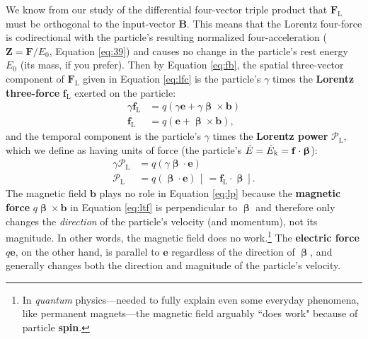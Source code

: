 \documentclass[12pt]{article}
\renewcommand{\vv}[1]{\mathbf{#1}}
\newcommand{\vvbeta}{\bm{\upbeta}}
\begin{document}
We know from our study of the differential four-vector triple product that $\vv F_{\mathrm{L}}$ must be orthogonal to the input-vector $\vv B$. This means that the Lorentz four-force is codirectional with the particle's resulting normalized four-acceleration ($\vv Z =  \vv F / E_0$, Equation \ref{eq:39}) and causes no change in the particle's rest energy $E_0$ (its mass, if you prefer). Then by Equation \ref{eq:fb}, the spatial three-vector component of $\vv F_{\textrm{L}}$ given in Equation \ref{eq:lfc} is the particle's $\gamma$ times the \textbf{Lorentz three-force} $\vv f_{\textrm{L}}$ exerted on the particle:
\begin{equation}\label{eq:ltf}
\begin{split}
\gamma \vv f_{\textrm{L}} &= q ( \gamma \vv e + \gamma \vvbeta \times \vv b ) \\
\vv f_{\textrm{L}} &= q ( \vv e + \vvbeta \times \vv b ),
\end{split}
\end{equation}
and the temporal component is the particle's $\gamma$ times the \textbf{Lorentz power} $\mathcal{P}_{\textrm{L}}$, which we define as having units of force (the particle's $\dot{E} = \dot{E}_{\mkern.5mu \textrm{k}} = \vv f \cdot \vvbeta$):
\begin{equation}\label{eq:lp}
\begin{split}
\gamma \mathcal{P}_{\textrm{L}} &= q ( \gamma \vvbeta \cdot \vv e ) \\
\mathcal{P}_{\textrm{L}} &= q ( \vvbeta \cdot \vv e ) \, \left[ \, = \vv f_{\textrm{L}} \cdot \vvbeta \right].
\end{split}
\end{equation}
The magnetic field $\vv b$ plays no role in Equation \ref{eq:lp} because the \textbf{magnetic force} $q \vvbeta \times \vv b$ in Equation \ref{eq:ltf} is perpendicular to $\vvbeta$ and therefore only changes the \emph{direction} of the particle's velocity (and momentum), not its magnitude. In other words, the magnetic field does no work.\footnote{In \emph{quantum} physics---needed to fully explain even some everyday phenomena, like permanent magnets---the magnetic field arguably ``does work" because of particle \textbf{spin}.} The \textbf{electric force} $q \vv e$, on the other hand, is parallel to $\vv e$ regardless of the direction of $\vvbeta$, and generally changes both the direction and magnitude of the particle's velocity.
\end{document}
